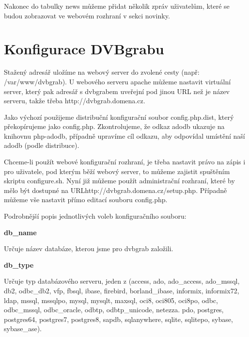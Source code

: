 Nakonec do tabulky news můžeme přidat několik zpráv uživatelům, které se budou zobrazovat ve webovém rozhraní v sekci novinky.

\vspace{10pt}

\section{Konfigurace DVBgrabu}

\vspace{10pt}

Stažený adresář uložíme na webový server do zvolené cesty (např: /var/www/dvbgrab). U webového serveru apache můžeme nastavit virtuální server, který pak adresář s dvbgrabem uveřejní pod jinou URL než je název serveru, takže třeba http://dvbgrab.domena.cz.

\vspace{10pt}

Jako výchozí použijeme distribuční konfigurační soubor config.php.dist, který překopírujeme jako config.php.
Zkontrolujeme, že odkaz adodb ukazuje na knihovnu php-adodb, případně upravíme cíl odkazu, aby odpovídal umístění naší adodb (podle distribuce).

\vspace{10pt}

Chceme-li použít webové konfigurační rozhraní, je třeba nastavit právo na zápis i pro uživatele, pod kterým běží webový server, to můžeme zajistit spuštěním skriptu configure.sh. Nyní již můžeme použít administrační rozhraní, které by mělo být dostupné na URL\linebreak[4] http://dvbgrab.domena.cz/setup.php. Případně můžeme vše nastavit přímo editací souboru config.php.

\vspace{10pt}

Podrobnější popis jednotlivých voleb konfiguračního souboru:

\vspace{10pt}

\textbf{db\_name}

Určuje název databáze, kterou jsme pro dvbgrab založili.

\vspace{10pt}

\textbf{db\_type}

Určuje typ databázového serveru, jeden z (access, ado, ado\_access, ado\_mssql, db2, odbc\_db2, vfp, fbsql, ibase, firebird, borland\_ibase, informix, informix72, ldap, mssql, mssqlpo, mysql, mysqlt, maxsql, oci8, oci805, oci8po, odbc, odbc\_mssql, odbc\_oracle, odbtp, odbtp\_unicode, netezza. pdo, postgres, postgres64, postgres7, postgres8, sapdb, sqlanywhere, sqlite, sqlitepo, sybase, sybase\_ase).

